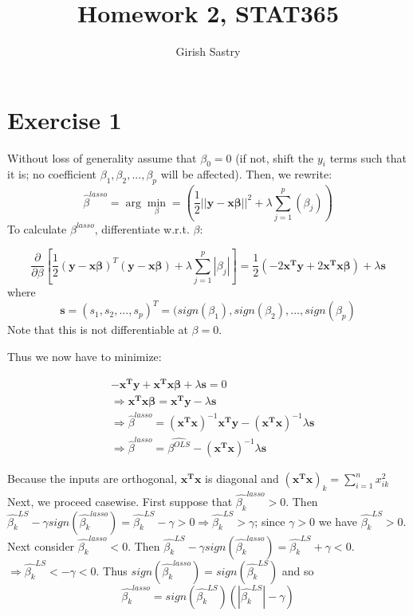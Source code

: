 \documentclass[a4paper,10pt]{article}
\title{Homework 2, STAT365}
\author{Girish Sastry}
\begin{document}
\maketitle

\section{Exercise 1}

Without loss of generality assume that $\beta_0 = 0$ (if not, shift the $y_i$ terms such that it is; no coefficient
$\beta_1,\beta_2,...,\beta_p$ will be affected). Then, we rewrite:
  $$\hat{\beta}^{lasso} = \arg\min_{\beta} = \left(\frac{1}{2} ||\mathbf{y} - \mathbf{x\beta}||^2 + \lambda \sum_{j=1}^p(\beta_j)\right)$$
To calculate $\beta^{lasso}$, differentiate w.r.t. $\beta$:

$$ \frac{\partial}{\partial \beta} \left[ \frac{1}{2}(\mathbf{y} - \mathbf{x\beta})^T (\mathbf{y} - \mathbf{x \beta})
  + \lambda \sum_{j=1}^p|\beta_j|\right]
    = \frac{1}{2}\left(-2\mathbf{x^Ty} + 2\mathbf{x^Tx \beta}\right) + \lambda\mathbf{s} $$
     where 
      $$\mathbf{s} = (s_1, s_2, ..., s_p)^T = (sign(\beta_1), sign(\beta_2),...,sign(\beta_p)$$ Note that this is not differentiable at $\beta=0$.

Thus we now have to minimize:

\begin{align*} 
  &-\mathbf{x^Ty} + \mathbf{x^Tx \beta} + \lambda \mathbf{s} = 0 \\
  &\Rightarrow \mathbf{x^Tx \beta} = \mathbf{x^Ty} - \lambda \mathbf{s} \\
  &\Rightarrow \hat{\beta}^{lasso} = (\mathbf{x^Tx})^{-1}\mathbf{x^Ty} - (\mathbf{x^Tx})^{-1}\lambda\mathbf{s} \\
  &\Rightarrow \hat{\beta}^{lasso} = \hat{\beta^{OLS}} - (\mathbf{x^Tx})^{-1}\lambda\mathbf{s}
\end{align*}

Because the inputs are orthogonal, $\mathbf{x^Tx}$ is diagonal and $(\mathbf{x^Tx})_k = \sum_{i=1}^n x^2_{ik}$
Next, we proceed casewise. First suppose that $\hat{\beta_k}^{lasso} > 0$. Then $\hat{\beta_k}^{LS} - \gamma sign(\hat{\beta_k}^{lasso})
= \hat{\beta_k}^{LS} - \gamma > 0 \Rightarrow \hat{\beta_k}^{LS} > \gamma$; since $\gamma > 0$ we have $\hat{\beta_k}^{LS} > 0$.
Next consider $\hat{\beta_k}^{lasso} < 0$. Then $\hat{\beta_k}^{LS} - \gamma sign(\hat{\beta_k}^{lasso}) = \hat{\beta_k}^{LS} + \gamma < 0$.
  $\Rightarrow \hat{\beta_k}^{LS} < -\gamma < 0$. Thus $sign(\hat{\beta_k}^{lasso}) = sign(\hat{\beta_k}^{LS})$ and so
    $$\hat{\beta_k}^{lasso} = sign\left(\hat{\beta_k}^{LS}\right)\left(|\hat{\beta_k}^{LS}|-\gamma\right)$$
    
\end{document}
